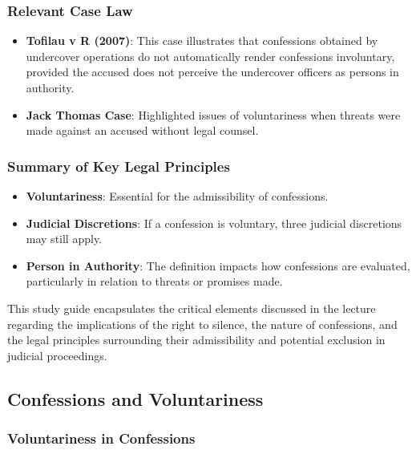 \subsubsection{Relevant Case Law}\label{relevant-case-law}

\begin{itemize}
\item
  \textbf{Tofilau v R (2007)}: This case illustrates that confessions
  obtained by undercover operations do not automatically render
  confessions involuntary, provided the accused does not perceive the
  undercover officers as persons in authority.
\item
  \textbf{Jack Thomas Case}: Highlighted issues of voluntariness when
  threats were made against an accused without legal counsel.
\end{itemize}

\subsubsection{Summary of Key Legal
Principles}\label{summary-of-key-legal-principles}

\begin{itemize}
\tightlist
\item
  \textbf{Voluntariness}: Essential for the admissibility of
  confessions.
\item
  \textbf{Judicial Discretions}: If a confession is voluntary, three
  judicial discretions may still apply.
\item
  \textbf{Person in Authority}: The definition impacts how confessions
  are evaluated, particularly in relation to threats or promises made.
\end{itemize}

This study guide encapsulates the critical elements discussed in the
lecture regarding the implications of the right to silence, the nature
of confessions, and the legal principles surrounding their admissibility
and potential exclusion in judicial proceedings.

\subsection{  Confessions and
Voluntariness}\label{confessions-and-voluntariness}

\subsubsection{Voluntariness in
Confessions}\label{voluntariness-in-confessions}

